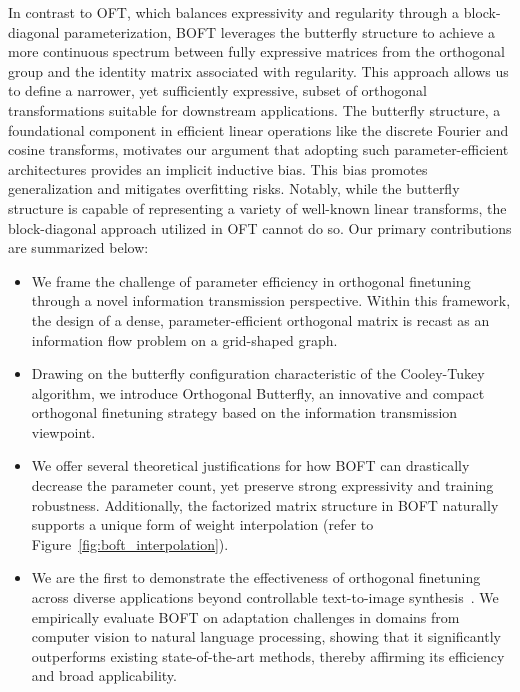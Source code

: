 In contrast to OFT, which balances expressivity and regularity through a block-diagonal parameterization, BOFT leverages the butterfly structure to achieve a more continuous spectrum between fully expressive matrices from the orthogonal group and the identity matrix associated with regularity. This approach allows us to define a narrower, yet sufficiently expressive, subset of orthogonal transformations suitable for downstream applications. The butterfly structure, a foundational component in efficient linear operations like the discrete Fourier and cosine transforms, motivates our argument that adopting such parameter-efficient architectures provides an implicit inductive bias. This bias promotes generalization and mitigates overfitting risks. Notably, while the butterfly structure is capable of representing a variety of well-known linear transforms, the block-diagonal approach utilized in OFT cannot do so. Our primary contributions are summarized below:

\begin{itemize}[leftmargin=*,nosep]
    \item We frame the challenge of parameter efficiency in orthogonal finetuning through a novel information transmission perspective. Within this framework, the design of a dense, parameter-efficient orthogonal matrix is recast as an information flow problem on a grid-shaped graph.
    \item Drawing on the butterfly configuration characteristic of the Cooley-Tukey algorithm, we introduce Orthogonal Butterfly, an innovative and compact orthogonal finetuning strategy based on the information transmission viewpoint.
    \item We offer several theoretical justifications for how BOFT can drastically decrease the parameter count, yet preserve strong expressivity and training robustness. Additionally, the factorized matrix structure in BOFT naturally supports a unique form of weight interpolation (refer to Figure~\ref{fig:boft_interpolation}).
    \item We are the first to demonstrate the effectiveness of orthogonal finetuning across diverse applications beyond controllable text-to-image synthesis~\cite{qiu2023controlling}. We empirically evaluate BOFT on adaptation challenges in domains from computer vision to natural language processing, showing that it significantly outperforms existing state-of-the-art methods, thereby affirming its efficiency and broad applicability.
\end{itemize}

